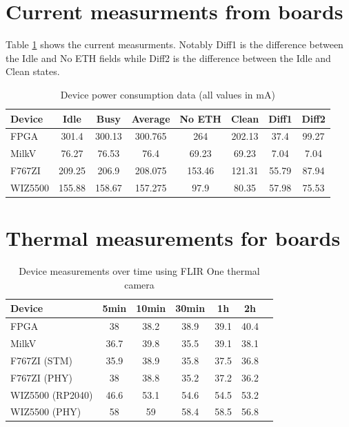 \section{Current measurments from boards}
\label{app:current_measurements}

Table \ref{tab:power_consumption} shows the current measurments. Notably Diff1 is the difference between the Idle and No ETH fields while Diff2 is the difference between the Idle and Clean states.

\begin{table}[ht]
    \centering
    \caption{Device power consumption data (all values in mA)}
    \label{tab:power_consumption}
    \begin{tabular}{lccccccc}
    \toprule
    Device    & Idle  & Busy  & Average  & No ETH  & Clean  & Diff1  & Diff2 \\
    \midrule
    FPGA      & 301.4     & 300.13    & 300.765      & 264         & 202.13           & 37.4     & 99.27       \\
    MilkV     & 76.27     & 76.53     & 76.4         & 69.23       & 69.23            & 7.04     & 7.04       \\
    F767ZI    & 209.25    & 206.9     & 208.075      & 153.46      & 121.31           & 55.79    & 87.94       \\
    WIZ5500   & 155.88    & 158.67    & 157.275      & 97.9        & 80.35            & 57.98    & 75.53       \\
    \bottomrule
    \end{tabular}
\end{table}


\section{Thermal measurements for boards}

\begin{table}[ht]
    \centering
    \caption{Device measurements over time using FLIR One thermal camera}
    \label{tab:measurements}
    \begin{tabular}{lcccccc}
    \toprule
    Device & 5min & 10min & 30min & 1h & 2h \\
    \midrule
    FPGA & 38 & 38.2 & 38.9 & 39.1 & 40.4 \\
    MilkV & 36.7 & 39.8 & 35.5 & 39.1 & 38.1 \\
    F767ZI (STM) & 35.9 & 38.9 & 35.8 & 37.5 & 36.8 \\
    F767ZI (PHY) & 38 & 38.8 & 35.2 & 37.2 & 36.2 \\
    WIZ5500 (RP2040) & 46.6 & 53.1 & 54.6 & 54.5 & 53.2 \\
    WIZ5500 (PHY) & 58 & 59 & 58.4 & 58.5 & 56.8 \\
    \bottomrule
\end{tabular}
\end{table}


